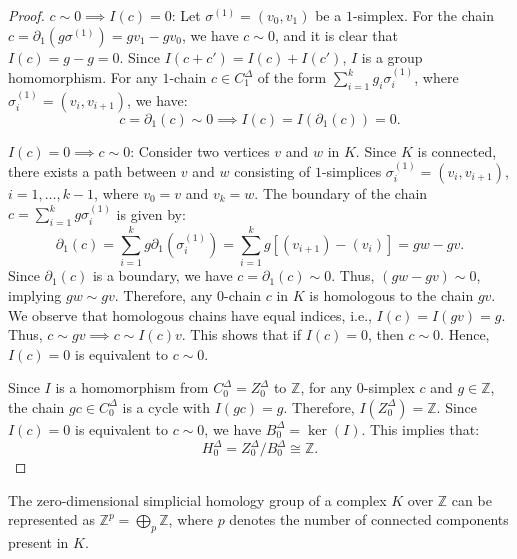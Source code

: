 \begin{proof}
	$c \sim 0 \implies I(c) = 0$: Let $\sigma^{(1)}= (v_{0}, v_{1})$ be a $1$-simplex.
	For the chain $c = \partial_{1}(g \sigma^{(1)}) = g v_{1} - g v_{0}$, we have
	$c \sim 0$, and it is clear that $I(c) = g - g = 0$. Since
	$I(c + c') = I(c) + I(c')$, $I$ is a group homomorphism. For any $1$-chain
	$c \in C^{\Delta}_{1}$ of the form $\sum_{i=1}^{k}g_{i} \sigma_{i}^{(1)}$, where
	$\sigma_{i}^{(1)}= (v_{i}, v_{i+1})$, we have:
	\[
		c = \partial_{1}(c) \sim 0 \implies I(c) = I(\partial_{1}(c)) = 0.
	\]

	$I(c) = 0 \implies c \sim 0$: Consider two vertices $v$ and $w$ in $K$. Since
	$K$ is connected, there exists a path between $v$ and $w$ consisting of $1$-simplices
	$\sigma_{i}^{(1)}= (v_{i}, v_{i+1})$, $i = 1, \ldots, k-1$, where $v_{0} = v$ and
	$v_{k} = w$. The boundary of the chain $c = \sum_{i=1}^{k}g \sigma_{i}^{(1)}$
	is given by:
	\[
		\partial_{1}(c) = \sum_{i=1}^{k}g \partial_{1}(\sigma_{i}^{(1)}) = \sum_{i=1}
		^{k}g [(v_{i+1}) - (v_{i})] = g w - g v.
	\]
	Since $\partial_{1}(c)$ is a boundary, we have $c = \partial_{1}(c) \sim 0$. Thus,
	$(g w - g v) \sim 0$, implying $g w \sim g v$. Therefore, any $0$-chain $c$ in
	$K$ is homologous to the chain $g v$. We observe that homologous chains have
	equal indices, i.e., $I(c) = I(g v) = g$. Thus, $c \sim g v \implies c \sim I(c
	) v$. This shows that if $I(c) = 0$, then $c \sim 0$. Hence, $I(c) = 0$ is equivalent
	to $c \sim 0$.

	Since $I$ is a homomorphism from $C^{\Delta}_{0} = Z^{\Delta}_{0}$ to $\mathbb{Z}$,
	for any $0$-simplex $c$ and $g \in \mathbb{Z}$, the chain $g c \in C^{\Delta}_{0}$
	is a cycle with $I(g c) = g$. Therefore, $I(Z^{\Delta}_{0}) = \mathbb{Z}$.
	Since $I(c) = 0$ is equivalent to $c \sim 0$, we have $B^{\Delta}_{0} = \ker(I)$.
	This implies that:
	\[
		H^{\Delta}_{0} = Z^{\Delta}_{0} / B^{\Delta}_{0} \cong \mathbb{Z}.
	\]
\end{proof}

\begin{corollary}
	\label{directsum0hom} The zero-dimensional simplicial homology group of a complex
	$K$ over $\mathbb{Z}$ can be represented as $\mathbb{Z}^{p} = \bigoplus_{p} \mathbb{Z}$,
	where $p$ denotes the number of connected components present in $K$.
\end{corollary}

